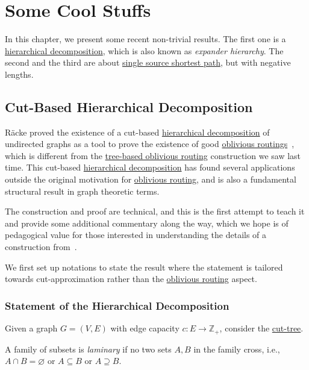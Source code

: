 \chapter{Some Cool Stuffs}
In this chapter, we present some recent non-trivial results. The first one is a \hyperref[def:hierarchical-decopmposition]{hierarchical decomposition}, which is also known as \emph{expander hierarchy}. The second and the third are about \hyperref[prb:SSSP]{single source shortest path}, but with negative lengths.

\section{Cut-Based Hierarchical Decomposition}
Räcke proved the existence of a cut-based \hyperref[def:hierarchical-decomposition]{hierarchical decomposition} of undirected graphs as a tool to prove the existence of good \hyperref[prb:oblivious-routing]{oblivious routings}~\cite{racke2002minimizing}, which is different from the \hyperref[not:tree-based-oblivious-routing]{tree-based oblivious routing} construction we saw last time. This cut-based \hyperref[def:hierarchical-decomposition]{hierarchical decomposition} has found several applications outside the original motivation for \hyperref[prb:oblivious-routing]{oblivious routing}, and is also a fundamental structural result in graph theoretic terms.

\begin{note}
	The construction and proof are technical, and this is the first attempt to teach it and provide some additional commentary along the way, which we hope is of pedagogical value for those interested in understanding the details of a construction from~\cite{bienkowski2003practical}.
\end{note}

We first set up notations to state the result where the statement is tailored towards cut-approximation rather than the \hyperref[prb:oblivious-routing]{oblivious routing} aspect.

\subsection{Statement of the Hierarchical Decomposition}
Given a graph \(G = (V, E)\) with edge capacity \(c \colon E \to \mathbb{Z} _+\), consider the \hyperref[def:cut-tree]{cut-tree}.

\begin{definition}[Laminary]\label{def:laminary}
	A family of subsets is \emph{laminary} if no two sets \(A, B\) in the family cross, i.e., \(A \cap B = \varnothing \) or \(A \subseteq B\) or \(A \supseteq B\).
\end{definition}

